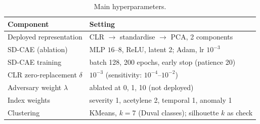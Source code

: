 \begin{table}[t]
\centering
\caption{Main hyperparameters.}
\label{tab:hp}
\begin{tabular}{ll}
\toprule
Component & Setting \\
\midrule
Deployed representation & CLR $\rightarrow$ standardise $\rightarrow$ PCA, 2 components \\
SD-CAE (ablation) & MLP $16\text{--}8$, ReLU, latent 2; Adam, lr $10^{-3}$ \\
SD-CAE training & batch 128, 200 epochs, early stop (patience 20) \\
CLR zero-replacement $\delta$ & $10^{-3}$ (sensitivity: $10^{-4}$--$10^{-2}$) \\
Adversary weight $\lambda$ & ablated at 0, 1, 10 (not deployed) \\
Index weights & severity 1, acetylene 2, temporal 1, anomaly 1 \\
Clustering & KMeans, $k=7$ (Duval classes); silhouette $k$ as check \\
\bottomrule
\end{tabular}
\end{table}
